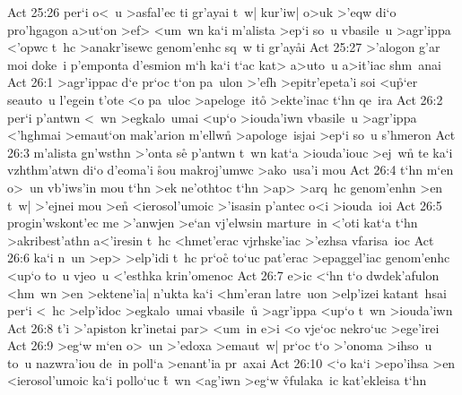 \vs Act 25:26
per`i
o<~u
>asfal'ec
ti
gr'ayai
t~w|
kur'iw|
o>uk
>'eqw
di`o
pro'hgagon
a>ut`on
>ef>
<um~wn
ka`i
m'alista
>ep`i
so~u
vbasile~u
>agr'ippa
<'opwc
t~hc
>anakr'isewc
genom'enhc
sq~w
ti
gr'ay\r{a}i\bibvsend
{}
\vs Act 25:27
>'alogon
g'ar
moi
doke~i
p'emponta
d'esmion
m`h
ka`i
t`ac
kat>
a>uto~u
a>it'iac
shm~anai\bibvsend
\vs Act 26:1
>agr'ippac
d`e
pr`oc
t`on
pa~ulon
>'efh
>epitr'epeta'i
soi
<u\r{p}`er
seauto~u
l'egein
t'ote
<o
pa~uloc
>apeloge~ito\r{}
>ekte'inac
t`hn
qe~i\-ra\bibvsend
\vs Act 26:2
per`i
p'antwn
<~wn
>egkalo~umai
<up`o
>iouda'iwn
vbasile~u
>agr'ippa
<'hghmai
>emaut`on
mak'arion
m'ellwn\r{}
>apologe~isjai
>ep`i
so~u
s'hmeron\bibvsend
\vs Act 26:3
m'alista
gn'wsthn
>'onta
s\r{e}
p'antwn
t~wn
kat`a
>iouda'iouc
>ej~w\r{n}
te
ka`i
vzhthm'atwn
di`o
d'eoma'i
\r{s}ou
makroj'umwc
>ako~usa'i
mou\bibvsend
\vs Act 26:4
t`hn
m`en
o>~un
vb'iws'in
mou
t`hn
>ek
ne'othtoc
t`hn
>ap>
>arq~hc
genom'enhn
>en
t~w|
>'ejnei
mou
>e\r{n}
<ierosol'umoic
>'isasin
p'antec
o<i
>iouda~ioi\bibvsend
\vs Act 26:5
progin'wskont'ec
me
>'anwjen
>e`an
vj'elwsin
marture~in
<'oti
kat`a
t`hn
>akribest'athn
a<'iresin
t~hc
<hmet'erac
vjrhske'iac
>'ezhsa
vfarisa~ioc\bibvsend
\vs Act 26:6
ka`i
n~un
>ep>
>elp'idi
t~hc
pr`oc\r{}
to`uc
pat'erac
>epaggel'iac
genom'enhc
<up`o
to~u
vjeo~u
<'esthka
krin'omenoc\bibvsend
\vs Act 26:7
e>ic
<`hn
t`o
dwdek'afulon
<hm~wn
>en
>ektene'ia|
n'ukta
ka`i
<hm'eran
latre~uon
>elp'izei
katant~hsai
per`i
<~hc
>elp'idoc
>egkalo~umai
vbasile~u\r{}
>agr'ippa
<up`o
t~wn
>iouda'iwn\bibvsend
\vs Act 26:8
t'i
>'apiston
kr'inetai
par>
<um~in
e>i
<o
vje`oc
nekro`uc
>ege'irei\bibvsend
\vs Act 26:9
>eg`w
m`en
o>~un
>'edoxa
>emaut~w|
pr`oc
t`o
>'onoma
>ihso~u
to~u
nazwra'iou
de~in
poll`a
>enant'ia
pr~axai\bibvsend
\vs Act 26:10
<`o
ka`i
>epo'ihsa
>en
<ierosol'umoic
ka`i
pollo`uc
\r{t}~wn
<ag'iwn
>eg`w
\r{vf}ulaka~ic
kat'ekleisa
t`hn
